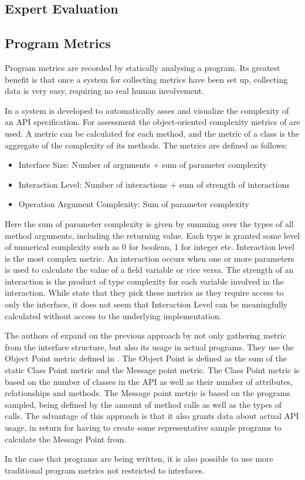 \subsection{Expert Evaluation}

\subsection{Program Metrics}
Program metrics are recorded by statically analysing a program. Its greatest benefit is that once a system for collecting metrics have been set up, collecting data is very easy, requiring no real human involvement. 

In \cite{de2009automatic} a system is developed to automatically asses and visualize the complexity of an \gls{API} specification. For assessment the object-oriented complexity metrics of \cite{bandi2003predicting} are used. A metric can be calculated for each method, and the metric of a class is the aggregate of the complexity of its methods.  The metrics are defined as follows:

\begin{itemize}
\item  Interface Size: Number of arguments + sum of parameter complexity
\item Interaction Level: Number of interactions + sum of strength of interactions
\item Operation Argument Complexity: Sum of parameter complexity
\end{itemize} 

Here the sum of parameter complexity is given by summing over the types of all method arguments, including the returning value.
Each type is granted some level of numerical complexity such as 0 for boolean, 1 for integer etc.
Interaction level is the most complex metric.
An interaction occurs when one or more parameters is used to calculate the value of a field variable or vice versa.
The strength of an interaction is the product of type complexity for each variable involved in the interaction.
While \cite{de2009automatic} state that they pick these metrics as they require access to only the interface, it does not seem that Interaction Level can be meaningfully calculated without access to the underlying implementation. 

The authors of \cite{alatalo2013comparative} expand on the previous approach by not only gathering metric from the interface structure, but also its usage in actual programs.
They use the Object Point metric defined in \cite{sneed1995estimating}.
The Object Point is defined as the sum of the static Class Point metric and the Message point metric.
The Class Point metric is based on the number of classes in the \gls{API} as well as their number of attributes, relationships and methods.
The Message point metric is based on the programs sampled, being defined by the amount of method calls as well as the types of calls.
The advantage of this approach is that it also grants data about actual \gls{API} usage, in return for having to create some representative sample programs to calculate the Message Point from.

In the case that programs are being written, it is also possible to use more traditional program metrics not restricted to interfaces. 